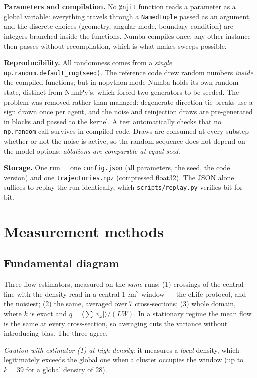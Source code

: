 \documentclass[11pt,a4paper]{article}
\newcommand{\code}[1]{\texttt{#1}}
\begin{document}
\textbf{Parameters and compilation.} No \code{@njit} function reads a parameter
as a global variable: everything travels through a \code{NamedTuple} passed as
an argument, and the discrete choices (geometry, angular mode, boundary
condition) are integers branched inside the functions. Numba compiles once; any
other instance then passes without recompilation, which is what makes sweeps
possible.

\textbf{Reproducibility.} All randomness comes from a \emph{single}
\code{np.random.default\_rng(seed)}. The reference code drew random numbers
\emph{inside} the compiled functions; but in nopython mode Numba holds its own
random state, distinct from NumPy's, which forced two generators to be seeded.
The problem was removed rather than managed: degenerate direction tie-breaks use
a sign drawn once per agent, and the noise and reinjection draws are
pre-generated in blocks and passed to the kernel. A test automatically checks
that no \code{np.random} call survives in compiled code. Draws are consumed at
every substep whether or not the noise is active, so the random sequence does
not depend on the model options: \emph{ablations are comparable at equal seed}.

\textbf{Storage.} One run = one \code{config.json} (all parameters, the seed,
the code version) and one \code{trajectories.npz} (compressed float32). The JSON
alone suffices to replay the run identically, which
\code{scripts/replay.py} verifies bit for bit.

\section{Measurement methods}

\subsection{Fundamental diagram}

Three flow estimators, measured on the \emph{same} runs:
(1) crossings of the central line with the density read in a central
1 cm$^2$ window --- the eLife protocol, and the noisiest;
(2) the same, averaged over 7 cross-sections; (3) whole domain, where $k$ is
exact and $q=\langle\sum|v_x|\rangle/(LW)$. In a stationary regime the mean flow
is the same at every cross-section, so averaging cuts the variance without
introducing bias. The three agree.

\emph{Caution with estimator (1) at high density}: it measures a \emph{local}
density, which legitimately exceeds the global one when a cluster occupies the
window (up to $k=39$ for a global density of 28).
\end{document}
